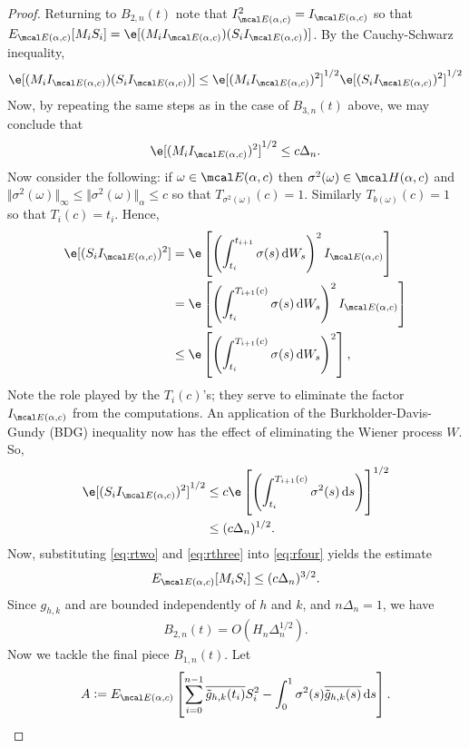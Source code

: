 \begin{appendices}
\begin{proof}
Returning to $B_{2,n}(t)$ note that $\indvol^2 = \indvol$ so that
$\eind[M_iS_i] = \e[(M_i \indvol) (S_i \indvol)]$. By the Cauchy-Schwarz inequality, 
\begin{align}
  \e[(M_i \indvol) (S_i \indvol)]\le \e[(M_i \indvol)^2]^{1/2}\e[ (S_i \indvol)^2]^{1/2}\label{eq:rfour}
\end{align}
Now, by repeating the same steps as in the case of  $B_{3,n}(t)$ above, we  may conclude that 
\begin{align} 
  \e[(M_i \indvol)^2]^{1/2} \le  c \Delta_n \label{eq:rtwo}.
\end{align}
Now consider the following: if $\omega \in \eball{\alpha}{c}$ then $\sigma^2(\omega) \in \hball{\alpha}{c}$ and $\Vert \sigma^2(\omega) \Vert_\infty \le \Vert \sigma^2(\omega)\Vert_\alpha \le c$ so  that $T_{\sigma^2(\omega)}(c) = 1$. Similarly $T_{b(\omega)}(c) = 1$ so that $T_i(c) = t_i$.  Hence, 
\begin{align}
  \e[ (S_i \indvol)^2] &= \e\left[\left(\int_{t_i}^{t_{i+1}} \sigma(s) \D W_s\right)^2\indvol\right]\notag\\
&= \e\left[\left(\int_{t_i}^{T_{i+1}(c)} \sigma(s) \D W_s\right)^2\indvol\right]\notag\\
&\le \e\left[\left(\int_{t_i}^{T_{i+1}(c)} \sigma(s) \D W_s\right)^2\right],
\end{align}
Note the role played by the $T_i(c)$'s; they serve to eliminate the factor $\indvol$ from the computations.  An application of the Burkholder-Davis-Gundy (BDG) inequality now has the effect of eliminating the Wiener process $W$. So,
\begin{align}
  \notag\e[ (S_i \indvol)^2]^{1/2} &\le c\e\left[\left(\int_{t_i}^{T_{i+1}(c)} \sigma^2(s) \D s\right)\right]^{1/2}\notag \\
  &\le (c \Delta_n)^{1/2}.\label{eq:rthree}
\end{align}
 Now, substituting \eqref{eq:rtwo} and \eqref{eq:rthree} into \eqref{eq:rfour} yields the estimate
\begin{align}
  \eind[M_i S_i] \le (c\Delta_n)^{3/2}.\label{eq:ms}
\end{align}
Since  $g_{h,k}$ and \tghk  are bounded independently of $h$ and $k$, and $n\Delta_n = 1$, we have
\begin{align}
  B_{2,n}(t) = O( H_n \Delta_n^{1/2}).
  \label{}
\end{align}
Now we tackle the final piece $B_{1,n}(t)$. Let 
\begin{align}
  A  := \eind\left[\sum_{i=0}^{n-1}\btghki S_i^2 -\int_{0}^{1} \sigma^2(s) \btghks \D s\right].

\end{align}
\end{proof}
\end{appendices}
